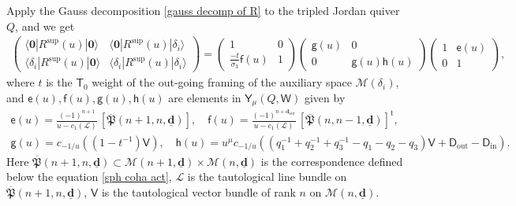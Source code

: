 \documentclass[10pt]{amsart}
\theoremstyle{definition}
\numberwithin{equation}{section}
\newcommand{\bd}{\mathbf{d}}
\newcommand{\cM}{\mathcal{M}}
\newcommand{\sT}{\mathsf{T}}
\newcommand{\sW}{\mathsf{W}}
\newcommand{\In}{\operatorname{in}}
\newcommand{\Out}{\operatorname{out}}
\begin{document}
Apply the Gauss decomposition \eqref{gauss decomp of R} to the tripled Jordan quiver $Q$, and we get
\begin{align*}
\begin{pmatrix}
\langle\mathbf 0|R^{\mathrm{sup}}(u)|\mathbf 0\rangle & \langle\mathbf 0|R^{\mathrm{sup}}(u)|\delta_i\rangle \\
\langle\delta_i|R^{\mathrm{sup}}(u)|\mathbf 0\rangle & \langle\delta_i|R^{\mathrm{sup}}(u)|\delta_i\rangle
\end{pmatrix}=
\begin{pmatrix}
1 & 0 \\
\frac{-t}{\sigma_3}\mathsf f(u) & 1
\end{pmatrix}
\begin{pmatrix}
\mathsf g(u) & 0 \\
0 & \mathsf g(u)\mathsf h(u) 
\end{pmatrix}
\begin{pmatrix}
1 & \mathsf e(u)\\
0 & 1 
\end{pmatrix},
\end{align*}
where $t$ is the $\sT_0$ weight of the out-going framing of the auxiliary space $\cM(\delta_i)$, and 
$\mathsf e(u), \mathsf f(u), \mathsf g(u), \mathsf h(u)$ are elements in $\mathsf Y_{\mu}(Q,\sW)$ given by 
\begin{gather*}
\mathsf e(u)=\frac{(-1)^{n+1}}{u-c_1(\mathcal L)}\,[\overline{\mathfrak{P}}(n+1,n,\underline{\bd})],\quad \mathsf f(u)=\frac{(-1)^{n+\bd_{\Out}}}{u-c_1(\mathcal L)}\,[\overline{\mathfrak{P}}(n,n-1,\underline{\bd})]^{\mathrm{t}},\\
\mathsf g(u)=c_{-1/u}((1-t^{-1})\mathsf V),\quad
\mathsf h(u)=u^{\mu}c_{-1/u}\left((q_1^{-1}+q_2^{-1}+q_3^{-1}-q_1-q_2-q_3)\mathsf V+\mathsf D_{\Out}-\mathsf D_{\In}\right).
\end{gather*}
Here $\overline{\mathfrak{P}}(n+1,n,\underline{\bd})\subset \cM(n+1,\underline{\bd})\times \cM(n,\underline{\bd})$ is the correspondence defined below the equation \eqref{sph coha act}, $\mathcal L$ is the tautological line bundle on $\overline{\mathfrak{P}}(n+1,n,\underline{\bd})$, $\mathsf V$ is the tautological vector bundle of rank $n$ on $\cM(n,\underline{\bd})$.
\end{document}
